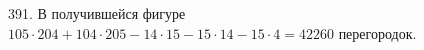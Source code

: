 391. В получившейся фигуре $105\cdot204+104\cdot205-14\cdot15-15\cdot14-15\cdot4=42260$ перегородок.\\
